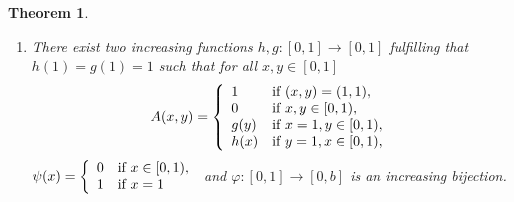 \documentclass[12pt]{article}
\newtheorem{theorem}{\bf Theorem}[section]
\begin{document}
\begin{theorem}
\begin{enumerate}
\item [(\romannumeral 3)] There exist two increasing functions $h, g : [0, 1] \rightarrow[0, 1]$ fulfilling that $h(1)=g(1)=1$ such that for all $x, y\in [0,1]$
\begin{equation}\label{eq3.12}
A(x,y)=\left\{\begin{array}{ll}
1 & {\mbox{\scriptsize\normalsize if  } (x,y)=(1,1)},\\
0 & {\mbox{\scriptsize\normalsize if  } x,y \in[0, 1)},\\
g(y) & {\mbox{\scriptsize\normalsize if  } x=1, y\in[0, 1)},\\
h(x) & {\mbox{\scriptsize\normalsize if  } y=1, x\in[0, 1)},
\end{array}
\right.
\end{equation}
$\psi(x)=\left\{\begin{array}{ll}
0 & {\mbox{\scriptsize\normalsize if } x\in[0, 1),}\\
1 & {\mbox{\scriptsize\normalsize if } x=1}
\end{array}
\right.$
and $\varphi:[0, 1] \rightarrow[0, b]$ is an increasing bijection.
\end{enumerate}
\end{theorem}
\end{document}
